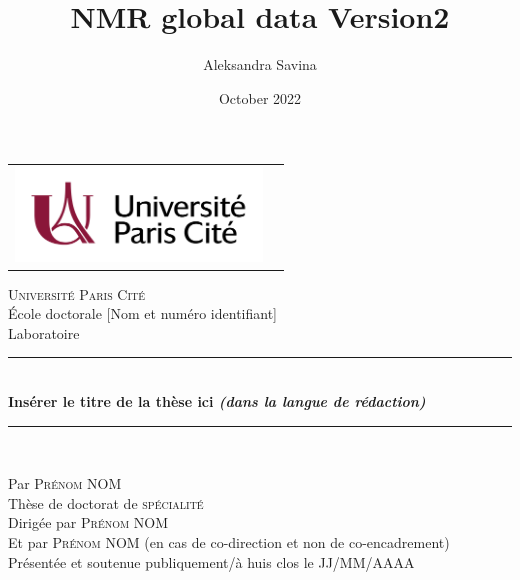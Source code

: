 \documentclass[a4paper,12pt,twoside,french]{book}
[a4paper,12pt,twoside]
\title{NMR global data Version2}
\author{Aleksandra Savina}
\date{October 2022}
\begin{document}
	\begin{titlepage}
		\begin{center}
			\begin{tabular}{c@{\hskip 7cm}c@{\hskip 1cm}}
				\includegraphics[height=2.5cm]{figures/PageTitre/UParisCitelogo.jpg} &
			\end{tabular}
		\end{center}
	
		\begin{center}
		
\vspace*{.03\textheight}
\textsc{\LARGE Université Paris Cité}\\[0.2cm] %
		\large École doctorale [Nom et numéro identifiant]\\
		  Laboratoire \\ 
  
  			\vfill
 
	 		\rule{\textwidth}{0.8pt} \\ %
	 		\vspace{10pt}
	 		 { \LARGE \bfseries Insérer le titre de la thèse ici \textit{(dans la langue de rédaction)}} %
	 		 \vspace{10pt}
	 		 \rule{\textwidth}{0.8pt} \\ %
		\end{center}
		
		\vfill
		\begin{center}
			Par \textsc{\Large Prénom NOM}\\[1cm] 
			Thèse de doctorat de \textsc{\large spécialité}\\[1.2cm]
			Dirigée par \textsc{\large Prénom NOM}\\[0.2cm]
            Et par \textsc{\large Prénom NOM} (en cas de co-direction et non de co-encadrement) \\[0.2cm] 
			Présentée et soutenue publiquement/à huis clos le JJ/MM/AAAA %
		\end{center}
		

\end{titlepage}
\end{document}

